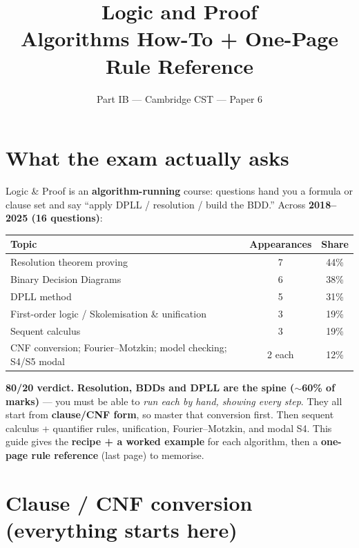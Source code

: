 \documentclass[11pt,a4paper]{article}
\title{\vspace{-1.5cm}\textbf{Logic and Proof} \\[2pt] \large Algorithms How-To + One-Page Rule Reference}
\author{\small Part IB --- Cambridge CST --- Paper 6}
\date{}
\begin{document}
\maketitle
\vspace{-0.8cm}

\section*{What the exam actually asks}

Logic \& Proof is an \textbf{algorithm-running} course: questions hand you a formula or clause set and say ``apply DPLL / resolution / build the BDD.'' Across \textbf{2018--2025 (16 questions)}:

\begin{center}
\begin{tabular}{lcc}
\hline
\textbf{Topic} & \textbf{Appearances} & \textbf{Share} \\
\hline
Resolution theorem proving & 7 & 44\% \\
Binary Decision Diagrams & 6 & 38\% \\
DPLL method & 5 & 31\% \\
First-order logic / Skolemisation \& unification & 3 & 19\% \\
Sequent calculus & 3 & 19\% \\
CNF conversion; Fourier--Motzkin; model checking; S4/S5 modal & 2 each & 12\% \\
\hline
\end{tabular}
\end{center}

\textbf{80/20 verdict.} \textbf{Resolution, BDDs and DPLL are the spine ($\sim$60\% of marks)} --- you must be able to \emph{run each by hand, showing every step}. They all start from \textbf{clause/CNF form}, so master that conversion first. Then sequent calculus + quantifier rules, unification, Fourier--Motzkin, and modal S4. This guide gives the \textbf{recipe + a worked example} for each algorithm, then a \textbf{one-page rule reference} (last page) to memorise.

\hrulefill

\section{Clause / CNF conversion (everything starts here)}
\end{document}
